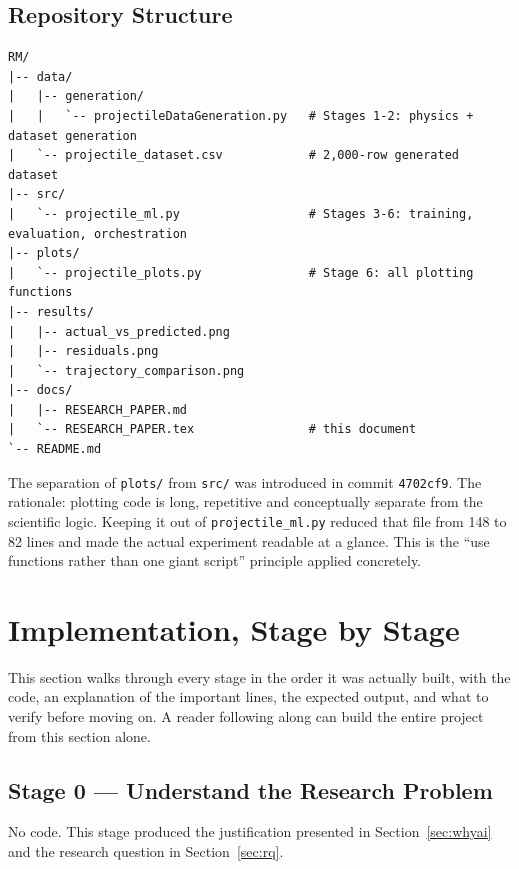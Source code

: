 \documentclass[11pt,a4paper]{article}
\begin{document}
\subsection{Repository Structure}

\begin{lstlisting}[style=shellstyle,numbers=none]
RM/
|-- data/
|   |-- generation/
|   |   `-- projectileDataGeneration.py   # Stages 1-2: physics + dataset generation
|   `-- projectile_dataset.csv            # 2,000-row generated dataset
|-- src/
|   `-- projectile_ml.py                  # Stages 3-6: training, evaluation, orchestration
|-- plots/
|   `-- projectile_plots.py               # Stage 6: all plotting functions
|-- results/
|   |-- actual_vs_predicted.png
|   |-- residuals.png
|   `-- trajectory_comparison.png
|-- docs/
|   |-- RESEARCH_PAPER.md
|   `-- RESEARCH_PAPER.tex                # this document
`-- README.md
\end{lstlisting}

The separation of \texttt{plots/} from \texttt{src/} was introduced in commit \texttt{4702cf9}. The
rationale: plotting code is long, repetitive and conceptually separate from the scientific logic.
Keeping it out of \texttt{projectile\_ml.py} reduced that file from 148 to 82 lines and made the
actual experiment readable at a glance. This is the ``use functions rather than one giant script''
principle applied concretely.

\section{Implementation, Stage by Stage}\label{sec:implementation}

This section walks through every stage in the order it was actually built, with the code, an
explanation of the important lines, the expected output, and what to verify before moving on. A
reader following along can build the entire project from this section alone.

\subsection*{Stage 0 --- Understand the Research Problem}

No code. This stage produced the justification presented in Section~\ref{sec:whyai} and the
research question in Section~\ref{sec:rq}.
\end{document}
